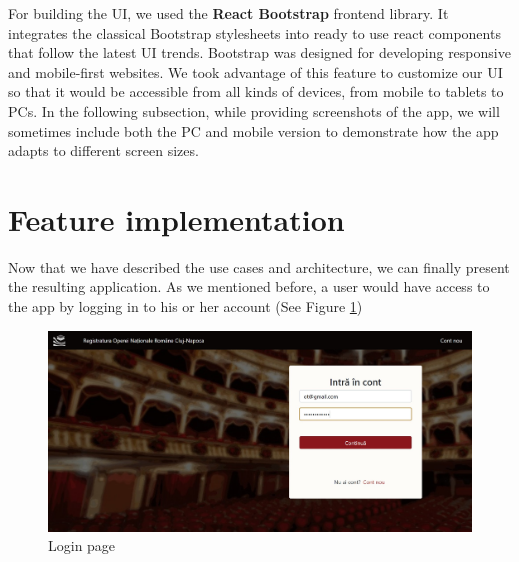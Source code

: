 For building the UI, we used the \textbf{React Bootstrap} frontend library. It integrates the classical Bootstrap stylesheets into ready to use react components that follow the latest UI trends. Bootstrap was designed for developing responsive and mobile-first websites. We took advantage of this feature to customize our UI so that it would be accessible from all kinds of devices, from mobile to tablets to PCs. In the following subsection, while providing screenshots of the app, we will sometimes include both the PC and mobile version to demonstrate how the app adapts to different screen sizes.



\section{Feature implementation}
\label{section:featureImplementation}

Now that we have described the use cases and architecture, we can finally present the resulting application. As we mentioned before, a user would have access to the app by logging in to his or her account (See Figure \ref{login})

\begin{figure}[ht]
    \centering
    \includegraphics[width=5.5in]{images/app/login_filled}
    \caption{Login page}
    \label{login}
\end{figure}

